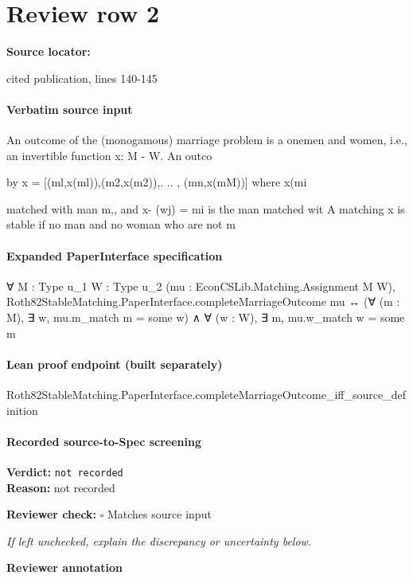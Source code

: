 \documentclass[10pt]{article}
\newcommand{\reviewerbox}{%
  \par\noindent\fbox{\parbox{0.96\linewidth}{\rule{0pt}{0.38in}}}\par
}
\newcommand{\reviewmatch}[1]{%
  \par\noindent\textbf{Reviewer check:} $\square$\; #1\par
  \noindent\emph{If left unchecked, explain the discrepancy or uncertainty below.}\par
}
\begin{document}
\section*{Review row 2}
\textbf{Source locator:} {\footnotesize\raggedright cited publication, lines 140-\allowbreak{}145\par}
\paragraph{Verbatim source input}
\begin{ReviewVerbatim}
An outcome of the (monogamous) marriage problem is a onemen and women, i.e., an invertible function x: M - W. An outco

by x = [(ml,x(ml)),(m2,x(m2)),. .. , (mn,x(mM))] where x(mi

matched with man m,, and x- (wj) = mi is the man matched wit
A matching x is stable if no man and no woman who are not m
\end{ReviewVerbatim}


\paragraph{Expanded PaperInterface specification}
\begin{ReviewVerbatim}
∀ {M : Type u_1} {W : Type u_2} (mu : EconCSLib.Matching.Assignment M W),
  Roth82StableMatching.PaperInterface.completeMarriageOutcome mu ↔
    (∀ (m : M), ∃ w, mu.m_match m = some w) ∧ ∀ (w : W), ∃ m, mu.w_match w = some m
\end{ReviewVerbatim}

\paragraph{Lean proof endpoint (built separately)}\begin{ReviewVerbatim}
Roth82StableMatching.PaperInterface.completeMarriageOutcome_iff_source_definition
\end{ReviewVerbatim}

\paragraph{Recorded source-to-Spec screening}
\textbf{Verdict:} \texttt{not recorded}
\\
\textbf{Reason:} not recorded
\reviewmatch{Matches source input}
\noindent\textbf{Reviewer annotation}\par
\reviewerbox
\clearpage
\hypertarget{source-claim-de65a07086fc73df}{}
\end{document}
